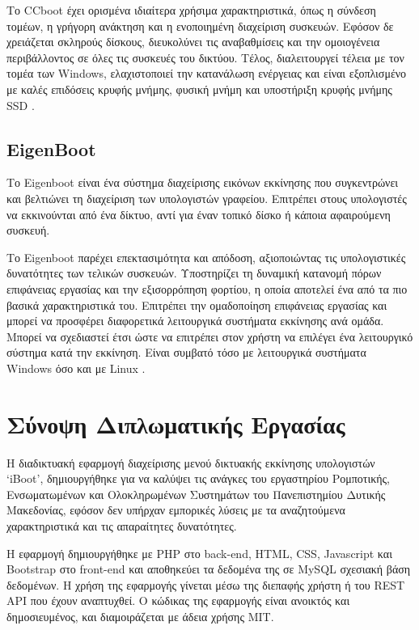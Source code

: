 Το CCboot έχει ορισμένα ιδιαίτερα χρήσιμα χαρακτηριστικά, όπως η σύνδεση τομέων, η γρήγορη ανάκτηση και η ενοποιημένη διαχείριση συσκευών. Εφόσον δε χρειάζεται σκληρούς δίσκους, διευκολύνει τις αναβαθμίσεις και την ομοιογένεια περιβάλλοντος σε όλες τις συσκευές του δικτύου. Τέλος, διαλειτουργεί τέλεια με τον τομέα των Windows, ελαχιστοποιεί την κατανάλωση ενέργειας και είναι εξοπλισμένο με καλές επιδόσεις κρυφής μνήμης, φυσική μνήμη και υποστήριξη κρυφής μνήμης SSD \cite{CCboot_2022}.

\subsection{EigenBoot}
Το Eigenboot είναι ένα σύστημα διαχείρισης εικόνων εκκίνησης που συγκεντρώνει και βελτιώνει τη διαχείριση των υπολογιστών γραφείου. Επιτρέπει στους υπολογιστές να εκκινούνται από ένα δίκτυο, αντί για έναν τοπικό δίσκο ή κάποια αφαιρούμενη συσκευή.

Το Eigenboot παρέχει επεκτασιμότητα και απόδοση, αξιοποιώντας τις υπολογιστικές δυνατότητες των τελικών συσκευών. Υποστηρίζει τη δυναμική κατανομή πόρων επιφάνειας εργασίας και την εξισορρόπηση φορτίου, η οποία αποτελεί ένα από τα πιο βασικά χαρακτηριστικά του. Επιτρέπει την ομαδοποίηση επιφάνειας εργασίας και μπορεί να προσφέρει διαφορετικά λειτουργικά συστήματα εκκίνησης ανά ομάδα. Μπορεί να σχεδιαστεί έτσι ώστε να επιτρέπει στον χρήστη να επιλέγει ένα λειτουργικό σύστημα κατά την εκκίνηση. Είναι συμβατό τόσο με λειτουργικά συστήματα Windows όσο και με Linux \cite{EigenBoot_2023}.

\section{Σύνοψη Διπλωματικής Εργασίας}
Η διαδικτυακή εφαρμογή διαχείρισης μενού δικτυακής εκκίνησης υπολογιστών `iBoot', δημιουργήθηκε για να καλύψει τις ανάγκες του εργαστηρίου Ρομποτικής, Ενσωματωμένων και Ολοκληρωμένων Συστημάτων του Πανεπιστημίου Δυτικής Μακεδονίας, εφόσον δεν υπήρχαν εμπορικές λύσεις με τα αναζητούμενα χαρακτηριστικά και τις απαραίτητες δυνατότητες.

Η εφαρμογή δημιουργήθηκε με PHP στο back-end, HTML, CSS, Javascript και Bootstrap στο front-end και αποθηκεύει τα δεδομένα της σε MySQL σχεσιακή βάση δεδομένων. Η χρήση της εφαρμογής γίνεται μέσω της διεπαφής χρήστη ή του REST API που έχουν αναπτυχθεί. Ο κώδικας της εφαρμογής είναι ανοικτός και δημοσιευμένος, και διαμοιράζεται με άδεια χρήσης MIT.

